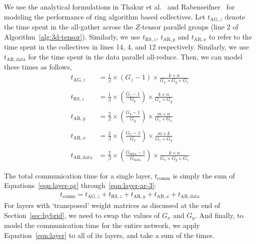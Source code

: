 We use the analytical formulations in Thakur et al.~\cite{thakurimproving2003}
and Rabenseifner~\cite{rabenseifneroptimization2004} for modeling the
performance of ring algorithm based collectives.  Let $t_{\mathrm{AG},z}$
denote the time spent in the all-gather across the $Z$-tensor parallel groups
(line 2 of Algorithm~\ref{alg:3d-tensor}). Similarly, we use
$t_{\mathrm{RS},z}$, $t_{\mathrm{AR},y}$ and $t_{\mathrm{AR}, x}$ to refer to
the time spent in the collectives in lines 14, 4, and 12 respectively.
Similarly, we use $t_{\mathrm{AR}, \mathrm{data}}$ for the time spent in the
data parallel all-reduce. Then, we can model these times as follows,
%
\begin{align}
    t_{\mathrm{AG},z} &= \frac{1}{\beta}\times (G_{z}-1) \times \frac{k \times n}{G_{x} \times G_{y} \times G_{z}}  
    \label{eqn:layer-ag} \\ \nonumber \\
    t_{\mathrm{RS},z} &= \frac{1}{\beta}\times \left( \frac{G_{z}-1}{\mathrm{G_{z}}} \right) \times \frac{k \times n}{G_{x} \times G_{y}} 
    \label{eqn:layer-rs} \\ \nonumber \\
    t_{\mathrm{AR},y} &= \frac{2}{\beta} \times \left( \frac{G_{y}-1}{G_{y}} \right) \times \frac{m \times n}{G_{z} \times \mathrm{G}_{x}}
    \label{eqn:layer-ar-1} \\ \nonumber \\
    t_{\mathrm{AR}, x} &= \frac{2}{\beta} \times \left( \frac{G_{x}-1}{G_{x}} \right)
    \times \frac{m \times k}{G_{z} \times G_{y}}
    \label{eqn:layer-ar-2} \\ \nonumber \\
    t_{\mathrm{AR}, \mathrm{data}} &= \frac{2}{\beta} \times \left( \frac{G_{\mathrm{data}}-1}{G_{\mathrm{data}}} \right) 
    \times \frac{k \times n}{G_{x} \times G_{y} \times G_{z}}
    \label{eqn:layer-ar-3}  
\end{align}

The total communication time for a single layer, ${t_{\mathrm{comm}}}$ is simply
the sum of Equations~\ref{eqn:layer-ag} through~\ref{eqn:layer-ar-3}: 
%
\begin{align}
    t_{\mathrm{comm}} = t_{\mathrm{AG},z} + t_{\mathrm{RS},z} +  t_{\mathrm{AR},y} + t_{\mathrm{AR},x} 
    + t_{\mathrm{AR}, \mathrm{data}} \label{eqn:layer} 
\end{align}
%
For layers with `transposed' weight matrices as discussed at the end of
Section~\ref{sec:hybrid}, we need to swap the values of $G_x$ and $G_y$. 
And finally, to model the communication time for
the entire network, we apply Equation~\ref{eqn:layer} to all of its layers, and
take a sum of the times.

